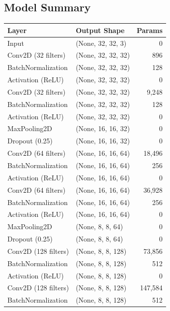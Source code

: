\documentclass[11pt]{article}
\begin{document}
\subsection{Model Summary}
\begin{table}[H]
    \centering
    \begin{tabular}{|l|l|r|}
        \hline
        \textbf{Layer} & \textbf{Output Shape} & \textbf{Params} \\ \hline
        Input & (None, 32, 32, 3) & 0 \\ \hline
        Conv2D (32 filters) & (None, 32, 32, 32) & 896 \\ \hline
        BatchNormalization & (None, 32, 32, 32) & 128 \\ \hline
        Activation (ReLU) & (None, 32, 32, 32) & 0 \\ \hline
        Conv2D (32 filters) & (None, 32, 32, 32) & 9,248 \\ \hline
        BatchNormalization & (None, 32, 32, 32) & 128 \\ \hline
        Activation (ReLU) & (None, 32, 32, 32) & 0 \\ \hline
        MaxPooling2D & (None, 16, 16, 32) & 0 \\ \hline
        Dropout (0.25) & (None, 16, 16, 32) & 0 \\ \hline
        Conv2D (64 filters) & (None, 16, 16, 64) & 18,496 \\ \hline
        BatchNormalization & (None, 16, 16, 64) & 256 \\ \hline
        Activation (ReLU) & (None, 16, 16, 64) & 0 \\ \hline
        Conv2D (64 filters) & (None, 16, 16, 64) & 36,928 \\ \hline
        BatchNormalization & (None, 16, 16, 64) & 256 \\ \hline
        Activation (ReLU) & (None, 16, 16, 64) & 0 \\ \hline
        MaxPooling2D & (None, 8, 8, 64) & 0 \\ \hline
        Dropout (0.25) & (None, 8, 8, 64) & 0 \\ \hline
        Conv2D (128 filters) & (None, 8, 8, 128) & 73,856 \\ \hline
        BatchNormalization & (None, 8, 8, 128) & 512 \\ \hline
        Activation (ReLU) & (None, 8, 8, 128) & 0 \\ \hline
        Conv2D (128 filters) & (None, 8, 8, 128) & 147,584 \\ \hline
        BatchNormalization & (None, 8, 8, 128) & 512 \\ \hline

\end{tabular}
\end{table}
\end{document}
